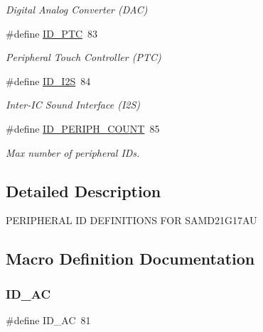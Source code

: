 \begin{DoxyCompactItemize}
\begin{DoxyCompactList}\small\item\em Digital Analog Converter (D\+AC) \end{DoxyCompactList}\item 
\#define \mbox{\hyperlink{group___s_a_m_d21_g17_a_u__id_ga6ce249818b3ff70438a4eff92e49d38e}{I\+D\+\_\+\+P\+TC}}~83
\begin{DoxyCompactList}\small\item\em Peripheral Touch Controller (P\+TC) \end{DoxyCompactList}\item 
\#define \mbox{\hyperlink{group___s_a_m_d21_g17_a_u__id_gac57cc3843ee128de44e5f43b5a272357}{I\+D\+\_\+\+I2S}}~84
\begin{DoxyCompactList}\small\item\em Inter-\/\+IC Sound Interface (I2S) \end{DoxyCompactList}\item 
\#define \mbox{\hyperlink{group___s_a_m_d21_g17_a_u__id_gad0762589e782b5eca161d9d344306da7}{I\+D\+\_\+\+P\+E\+R\+I\+P\+H\+\_\+\+C\+O\+U\+NT}}~85
\begin{DoxyCompactList}\small\item\em Max number of peripheral I\+Ds. \end{DoxyCompactList}\end{DoxyCompactItemize}


\subsection{Detailed Description}
P\+E\+R\+I\+P\+H\+E\+R\+AL ID D\+E\+F\+I\+N\+I\+T\+I\+O\+NS F\+OR S\+A\+M\+D21\+G17\+AU 

\subsection{Macro Definition Documentation}
\mbox{\label{group___s_a_m_d21_g17_a_u__id_ga20fe08f8d0b2a4e6c0dbb2371aacadb0}} 
\subsubsection{\texorpdfstring{ID\_AC}{ID\_AC}}
{\footnotesize\ttfamily \#define I\+D\+\_\+\+AC~81}



